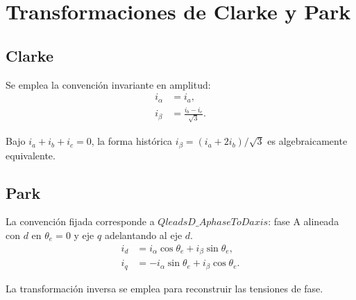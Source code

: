 \section{Transformaciones de Clarke y Park}

\subsection{Clarke}
Se emplea la convención invariante en amplitud:
\begin{align}
i_\alpha &= i_a,\\
i_\beta &= \frac{i_b-i_c}{\sqrt{3}}.
\end{align}

Bajo $i_a+i_b+i_c=0$, la forma histórica $i_\beta=(i_a+2i_b)/\sqrt{3}$ es algebraicamente equivalente.

\subsection{Park}
La convención fijada corresponde a $QleadsD\_AphaseToDaxis$: fase A alineada con $d$ en $\theta_e=0$ y eje $q$ adelantando al eje $d$.
\begin{align}
i_d &= i_\alpha\cos\theta_e+i_\beta\sin\theta_e,\\
i_q &= -i_\alpha\sin\theta_e+i_\beta\cos\theta_e.
\end{align}

La transformación inversa se emplea para reconstruir las tensiones de fase.
